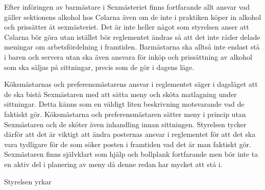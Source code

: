 \documentclass[../_main/handlingar.tex]{subfiles}
\begin{document}

Efter införingen av barmästare i Sexmästeriet finns fortfarande allt ansvar vad gäller sektionens alkohol hos Cølarna även om de inte i praktiken köper in alkohol och prissätter åt sexmästeriet. Det är inte heller något som styrelsen anser att Cølarna bör göra utan istället bör reglementet ändras så att det inte råder delade meningar om arbetsfördelning i framtiden. Barmästarna ska alltså inte endast stå i baren och servera utan ska även ansvara för inköp och prissättning av alkohol som ska säljas på sittningar, precis som de gör i dagens läge.

Köksmästarnas och preferensmästarens ansvar i reglementet säger i dagsläget att de ska bistå Sexmästaren med att sätta meny och sköta matlagning under sittningar. Detta känns som en väldigt liten beskrivning motsvarande vad de faktiskt gör. Köksmästarna och preferensmästaren sätter meny i princip utan Sexmästaren och de sköter även inhandling innan sittningen. Styrelsen tycker därför att det är viktigt att ändra posternas ansvar i reglementet för att det ska vara tydligare för de som söker posten i framtiden vad det är man faktiskt gör. Sexmästaren finns självklart som hjälp och bollplank fortfarande men bör inte ta en aktiv del i planering av meny då denne redan har mycket att stå i.

\newpage 
Styrelsen yrkar 
\end{document}
